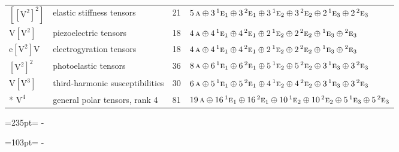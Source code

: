 \documentclass[10pt,a4paper]{article}
\newcommand{\needspace}[1]{\par\penalty-100\begingroup\dimen0=#1\relax\dimen2=\pagegoal
  \advance\dimen2-\pagetotal\ifdim\dimen0>\dimen2\relax\ifdim\dimen2>0pt\vfil\break\fi\fi
  \endgroup}
\numberwithin{equation}{section}
\newcommand{\irr}[1]{\text{\normalfont\scshape #1}}
\newcommand{\conjpair}[1]{{}^{#1}}
\newcommand{\jahn}[1]{\mathrm{#1}}
\newlength{\fillwidth}\newlength{\cellwidth}\newlength{\colwidth}
\begin{document}
{\begin{longtable}{@{}llr>{\RaggedRight\arraybackslash}p{\fillwidth}@{}}
$\jahn{[[V^{2}]^{2}]}$ & elastic stiffness tensors & 21 & $5\,\irr{a} \oplus\allowbreak 3\,\conjpair{1}\irr{e}_{1} \oplus\allowbreak 3\,\conjpair{2}\irr{e}_{1} \oplus\allowbreak 3\,\conjpair{1}\irr{e}_{2} \oplus\allowbreak 3\,\conjpair{2}\irr{e}_{2} \oplus\allowbreak 2\,\conjpair{1}\irr{e}_{3} \oplus\allowbreak 2\,\conjpair{2}\irr{e}_{3}$\\
$\jahn{V[V^{2}]}$ & piezoelectric tensors & 18 & $4\,\irr{a} \oplus\allowbreak 4\,\conjpair{1}\irr{e}_{1} \oplus\allowbreak 4\,\conjpair{2}\irr{e}_{1} \oplus\allowbreak 2\,\conjpair{1}\irr{e}_{2} \oplus\allowbreak 2\,\conjpair{2}\irr{e}_{2} \oplus\allowbreak \conjpair{1}\irr{e}_{3} \oplus\allowbreak \conjpair{2}\irr{e}_{3}$\\
$\jahn{e[V^{2}]V}$ & electrogyration tensors & 18 & $4\,\irr{a} \oplus\allowbreak 4\,\conjpair{1}\irr{e}_{1} \oplus\allowbreak 4\,\conjpair{2}\irr{e}_{1} \oplus\allowbreak 2\,\conjpair{1}\irr{e}_{2} \oplus\allowbreak 2\,\conjpair{2}\irr{e}_{2} \oplus\allowbreak \conjpair{1}\irr{e}_{3} \oplus\allowbreak \conjpair{2}\irr{e}_{3}$\\
$\jahn{[V^{2}]^{2}}$ & photoelastic tensors & 36 & $8\,\irr{a} \oplus\allowbreak 6\,\conjpair{1}\irr{e}_{1} \oplus\allowbreak 6\,\conjpair{2}\irr{e}_{1} \oplus\allowbreak 5\,\conjpair{1}\irr{e}_{2} \oplus\allowbreak 5\,\conjpair{2}\irr{e}_{2} \oplus\allowbreak 3\,\conjpair{1}\irr{e}_{3} \oplus\allowbreak 3\,\conjpair{2}\irr{e}_{3}$\\
$\jahn{V[V^{3}]}$ & third-harmonic susceptibilities & 30 & $6\,\irr{a} \oplus\allowbreak 5\,\conjpair{1}\irr{e}_{1} \oplus\allowbreak 5\,\conjpair{2}\irr{e}_{1} \oplus\allowbreak 4\,\conjpair{1}\irr{e}_{2} \oplus\allowbreak 4\,\conjpair{2}\irr{e}_{2} \oplus\allowbreak 3\,\conjpair{1}\irr{e}_{3} \oplus\allowbreak 3\,\conjpair{2}\irr{e}_{3}$\\*
$\jahn{V^{4}}$ & general polar tensors, rank 4 & 81 & $19\,\irr{a} \oplus\allowbreak 16\,\conjpair{1}\irr{e}_{1} \oplus\allowbreak 16\,\conjpair{2}\irr{e}_{1} \oplus\allowbreak 10\,\conjpair{1}\irr{e}_{2} \oplus\allowbreak 10\,\conjpair{2}\irr{e}_{2} \oplus\allowbreak 5\,\conjpair{1}\irr{e}_{3} \oplus\allowbreak 5\,\conjpair{2}\irr{e}_{3}$\\
\bottomrule\end{longtable}}
\needspace{235pt}
\needspace{103pt}
\end{document}

